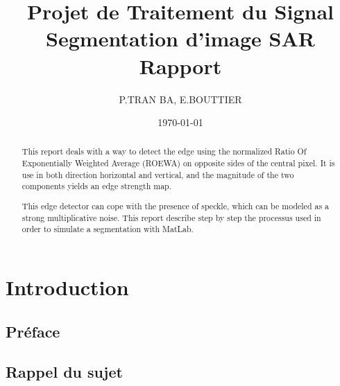 \documentclass[a4paper,11pt]{article}
\title{Projet de Traitement du Signal\\Segmentation d'image SAR\\Rapport}
\author{P.TRAN BA, E.BOUTTIER}
\date\today
\begin{document}
\maketitle

\begin{abstract}

This report deals with a way to detect the edge using the normalized Ratio Of Exponentially Weighted Average (ROEWA) on opposite sides of the central pixel. It is use in both direction horizontal and vertical, and the magnitude of the two components yields an edge strength map.

This edge detector can cope with the presence of speckle, which can be modeled as a strong multiplicative noise. This report describe step by step the processus used in order to simulate a segmentation with MatLab.

\end{abstract}

\tableofcontents

\newpage

\section{Introduction}
\subsection{Préface}



\subsection{Rappel du sujet}
\end{document}
